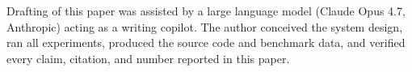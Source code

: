 \noindent Drafting of this paper was assisted by a large language model (Claude Opus 4.7, Anthropic) acting as a writing copilot. The author conceived the system design, ran all experiments, produced the source code and benchmark data, and verified every claim, citation, and number reported in this paper.
